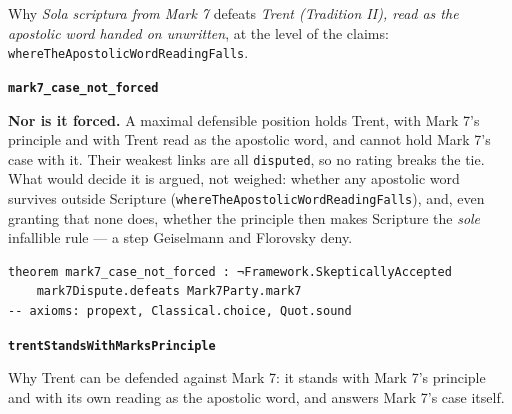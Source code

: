 \documentclass[11pt]{article}
\begin{document}
\noindent Why \emph{Sola scriptura from Mark 7} defeats \emph{Trent (Tradition II), read as the apostolic word handed on unwritten}, at the level of the claims: \texttt{where\allowbreak{}The\allowbreak{}Apostolic\allowbreak{}Word\allowbreak{}Reading\allowbreak{}Falls}.
\par\medskip\noindent\textbf{\texttt{mark7\_\allowbreak{}case\_\allowbreak{}not\_\allowbreak{}forced}}\par\nobreak\noindent
\textbf{Nor is it forced.} A maximal defensible position holds Trent, with Mark 7's principle and with Trent read as the apostolic word, and cannot hold Mark 7's case with it. Their weakest links are all \texttt{disputed}, so no rating breaks the tie. What would decide it is argued, not weighed: whether any apostolic word survives outside Scripture (\texttt{where\allowbreak{}The\allowbreak{}Apostolic\allowbreak{}Word\allowbreak{}Reading\allowbreak{}Falls}), and, even granting that none does, whether the principle then makes Scripture the \emph{sole} infallible rule — a step Geiselmann and Florovsky deny.

{\small\begin{verbatim}
theorem mark7_case_not_forced : ¬Framework.SkepticallyAccepted
    mark7Dispute.defeats Mark7Party.mark7
-- axioms: propext, Classical.choice, Quot.sound
\end{verbatim}}
\par\medskip\noindent\textbf{\texttt{trent\allowbreak{}Stands\allowbreak{}With\allowbreak{}Marks\allowbreak{}Principle}}\par\nobreak\noindent
Why Trent can be defended against Mark 7: it stands with Mark 7's principle and with its own reading as the apostolic word, and answers Mark 7's case itself.
\end{document}
